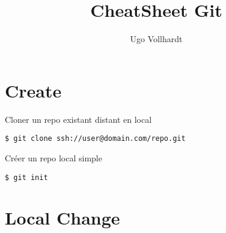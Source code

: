 \documentclass[jou,floatsintext]{apa6}
\title{CheatSheet Git}
\author{Ugo Vollhardt}%
\affiliation{CEA LIST - CentraleSupélec}
\begin{document}
\maketitle

\section{Create}

Cloner un repo existant distant en local
\begin{lstlisting}
$ git clone ssh://user@domain.com/repo.git
\end{lstlisting}
Créer un repo local simple
\begin{lstlisting}
$ git init
\end{lstlisting}

\section{Local Change}
\end{document}

